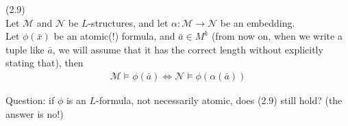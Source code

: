 \documentclass[a4paper]{article}
\begin{document}
\begin{prop} (2.9)\\
    Let $\mathcal{M}$ and $\mathcal{N}$ be $L$-structures, and let $\alpha: \mathcal{M} \to \mathcal{N}$ be an embedding.\\
    Let $\phi(\bar{x})$ be an atomic(!) formula, and $\bar{a} \in M^k$ (from now on, when we write a tuple like $\bar{a}$, we will assume that it has the correct length without explicitly stating that), then
    \begin{equation*}
        \begin{aligned}
            \mathcal{M} \vDash \phi(\bar{a}) \iff \mathcal{N} \vDash \phi(\alpha(\bar{a}))
        \end{aligned}
    \end{equation*}
\end{prop}

Question: if $\phi$ is an $L$-formula, not necessarily atomic, does (2.9) still hold? (the answer is no!)
\end{document}
